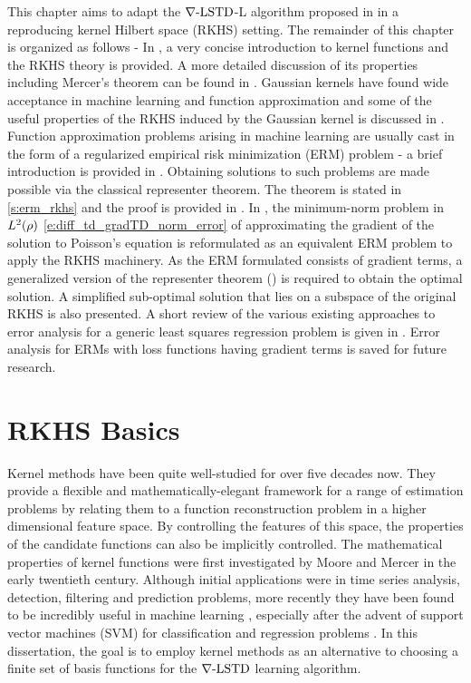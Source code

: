 This chapter aims to adapt the $\nabla\text{-LSTD}$-L algorithm proposed in  in a reproducing kernel Hilbert space (RKHS) setting.  The remainder of this chapter is organized as follows - In , a very concise introduction to kernel functions and the RKHS theory is provided. A more detailed discussion of its properties including Mercer's theorem can be found in . Gaussian kernels have found wide acceptance in machine learning and function approximation and some of the useful properties of the RKHS induced by the Gaussian kernel is discussed in . Function approximation problems arising in machine learning are usually cast in the form of a regularized empirical risk minimization (ERM) problem - a brief introduction is provided in . Obtaining solutions to such problems are made possible via the classical representer theorem. The theorem is stated in \ref{s:erm_rkhs} and the proof is provided in . In , the minimum-norm problem in $L^2(\rho)$ \eqref{e:diff_td_gradTD_norm_error} of approximating the gradient of the solution to Poisson's equation is reformulated as an equivalent ERM problem to apply the RKHS machinery. As the ERM formulated consists of gradient terms, a generalized  version of the representer theorem () is required to obtain the optimal solution.  A simplified sub-optimal solution that lies on a subspace of the original RKHS is also presented. A short review of the various existing approaches to error analysis for a generic least squares regression problem is given  in . Error analysis for ERMs with loss functions having gradient terms is saved for future research. 

\section{RKHS Basics}
\label{s:rkhs_basics}
Kernel methods have been quite well-studied for over five decades now. They provide a flexible and mathematically-elegant framework for a range of estimation problems by relating them to a function reconstruction problem in a higher dimensional feature space. By controlling the features of this space, the properties of the candidate functions can also be implicitly controlled. The mathematical properties of kernel functions were first investigated by Moore \cite{moo1916} and Mercer \cite{merrus09} in the early twentieth century. Although initial applications were in time series analysis, detection, filtering and prediction problems, more recently they have been found to be incredibly useful in machine learning \cite{wah90}, especially after the advent of support vector machines (SVM) for classification and regression problems \cite{corvap95, drucburkaufsmovap97}. In this dissertation, the goal is to employ kernel methods as an alternative to choosing a finite set of basis functions for the $\nabla\text{-LSTD}$ learning algorithm. 

